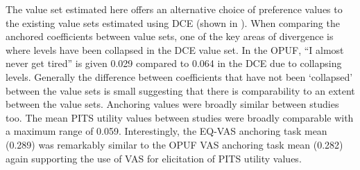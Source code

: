 \documentclass[
  number,
  preprint]{elsarticle}
\begin{document}
The value set estimated here offers an alternative choice of preference
values to the existing value sets estimated using DCE (shown in
\citep{tab-WAItEvalsets}). When comparing the anchored coefficients
between value sets, one of the key areas of divergence is where levels
have been collapsed in the DCE value set. In the OPUF, ``I almost never
get tired'' is given 0.029 compared to 0.064 in the DCE due to
collapsing levels. Generally the difference between coefficients that
have not been `collapsed' between the value sets is small suggesting
that there is comparability to an extent between the value sets.
Anchoring values were broadly similar between studies too. The mean PITS
utility values between studies were broadly comparable with a maximum
range of 0.059. Interestingly, the EQ-VAS anchoring task mean (0.289)
was remarkably similar to the OPUF VAS anchoring task mean (0.282) again
supporting the use of VAS for elicitation of PITS utility values.
\end{document}
